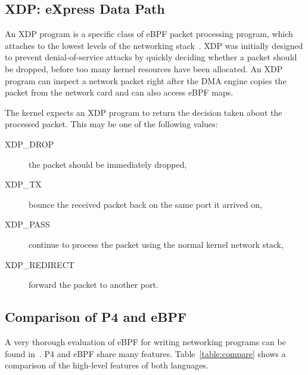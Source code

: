 \subsection{XDP: eXpress Data Path}\label{sec:xdp-background}

An XDP program is a specific class of eBPF packet processing program, which 
attaches to the lowest levels of the networking
stack~\cite{xdpconext18}. XDP was initially designed to prevent 
denial-of-service attacks by quickly deciding whether a packet should be 
dropped, before too many kernel resources have been allocated. An XDP program 
can inspect a network packet right after the DMA engine copies the packet
from the network card and can also access eBPF maps.

The kernel expects an XDP program to return the decision taken about the 
processed packet. This may be one of the following values:

\begin{description}
\item[XDP\_DROP] the packet should be immediately dropped,
\item[XDP\_TX] bounce the received packet back on the same port it arrived on,
\item[XDP\_PASS] continue to process the packet using the normal kernel network 
stack,
\item[XDP\_REDIRECT] forward the packet to another port.
\end{description}

\subsection{Comparison of P4 and eBPF}

A very thorough evaluation of eBPF for writing networking programs can
be found in~\cite{minao-hspr18}.  P4 and eBPF share many features.
Table~\ref{table:compare} shows a comparison of the high-level
features of both languages.

